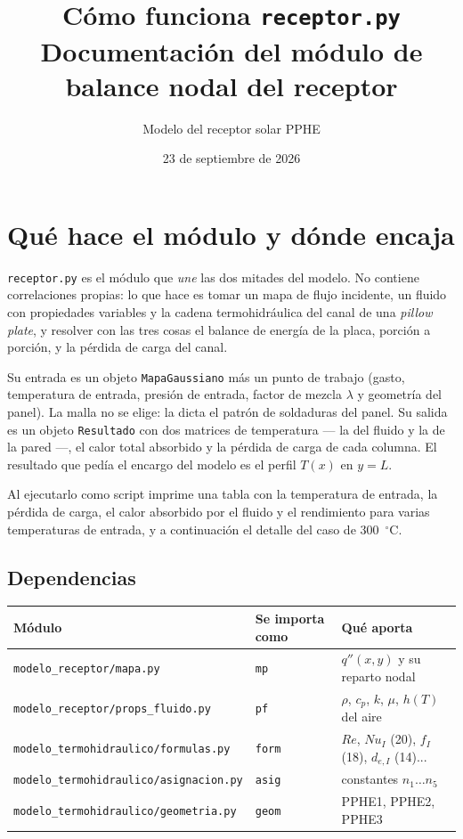 \documentclass[11pt,a4paper]{article}
\title{Cómo funciona \texttt{receptor.py}\\
       \large Documentación del módulo de balance nodal del receptor}
\author{Modelo del receptor solar PPHE}
\date{23 de septiembre de 2026}
\begin{document}
\maketitle
\tableofcontents
\bigskip

\section{Qué hace el módulo y dónde encaja}

\texttt{receptor.py} es el módulo que \emph{une} las dos mitades del modelo. No
contiene correlaciones propias: lo que hace es tomar un mapa de flujo incidente,
un fluido con propiedades variables y la cadena termohidráulica del canal de una
\emph{pillow plate}, y resolver con las tres cosas el balance de energía de la
placa, porción a porción, y la pérdida de carga del canal.

Su entrada es un objeto \texttt{MapaGaussiano} más un punto de trabajo (gasto,
temperatura de entrada, presión de entrada, factor de mezcla $\lambda$ y
geometría del panel). La malla no se elige: la dicta el patrón de soldaduras del
panel. Su salida es un objeto \texttt{Resultado} con dos matrices de temperatura
--- la del fluido y la de la pared ---, el calor total absorbido y la pérdida de
carga de cada columna. El resultado que pedía el encargo del modelo es el perfil
$T(x)$ en $y = L$.

Al ejecutarlo como script imprime una tabla con la temperatura de entrada, la
pérdida de carga, el calor absorbido por el fluido y el rendimiento para varias
temperaturas de entrada, y a continuación el detalle del caso de 300~$^\circ$C.

\subsection{Dependencias}

\begin{center}
\begin{tabular}{lll}
  \toprule
  Módulo & Se importa como & Qué aporta \\
  \midrule
  \texttt{modelo\_receptor/mapa.py}          & \texttt{mp}   & $q''(x,y)$ y su reparto nodal \\
  \texttt{modelo\_receptor/props\_fluido.py} & \texttt{pf}   & $\rho$, $c_p$, $k$, $\mu$, $h(T)$ del aire \\
  \texttt{modelo\_termohidraulico/formulas.py}   & \texttt{form} & $Re$, $Nu_I$ (20), $f_I$ (18), $d_{e,I}$ (14)... \\
  \texttt{modelo\_termohidraulico/asignacion.py} & \texttt{asig} & constantes $n_1\ldots n_5$ \\
  \texttt{modelo\_termohidraulico/geometria.py}  & \texttt{geom} & PPHE1, PPHE2, PPHE3 \\
  \bottomrule
\end{tabular}
\end{center}
\end{document}
